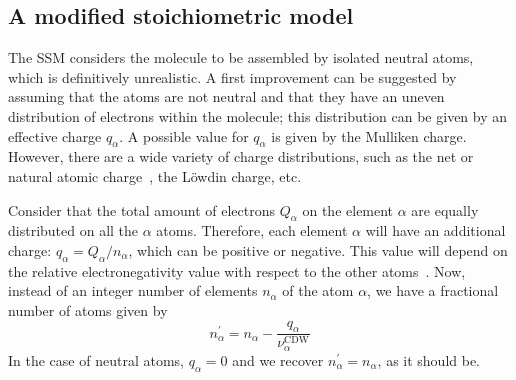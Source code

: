 \documentclass[preprint,12pt]{article}
\begin{document}
\subsection{A modified stoichiometric model}

The SSM considers the molecule to be assembled by isolated neutral atoms, 
which is definitively unrealistic. A first improvement can be suggested 
by assuming that the atoms are not neutral and that they have an uneven
distribution of electrons within the molecule; this distribution can be
given by an effective charge $q_{\alpha}$. A possible value for 
$q_{\alpha}$ is given by the Mulliken charge. However, there are a wide
variety of charge distributions, such as the net or natural atomic
charge~\cite{lee2003}, the L\"owdin charge, etc.

Consider that the total amount of electrons $Q_{\alpha }$ on the element
$\alpha$ are equally distributed on all the $\alpha$ atoms. Therefore, 
each element $\alpha$ will have an additional charge: 
$q_{\alpha}=Q_{\alpha}/n_{\alpha}$, which can be positive or negative.
This value will depend on the relative electronegativity value with 
respect to the other atoms~\cite{rappe1991}. Now, instead of an
integer number of elements $n_{\alpha}$ of the atom $\alpha$, we have a 
fractional number of atoms given by 
\begin{equation}
n_{\alpha }^{\prime }=n_{\alpha }-
\frac{q_{\alpha }}{\nu_{\alpha }^{\text{CDW}}}
\label{eq:newstoi}
\end{equation}%
In the case of neutral atoms, $q_{\alpha}=0$ and we recover 
$n_{\alpha}^{\prime}=n_{\alpha}$, as it should be.
\end{document}
